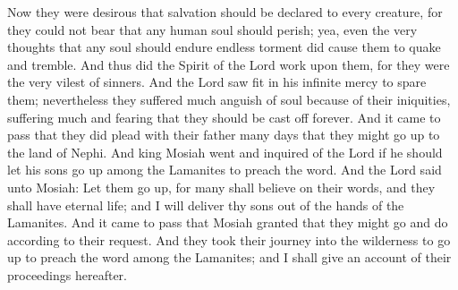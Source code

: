 \bverse \iffalse Now they were desirous that salvation should be declared to every creature, for they could not bear that any human soul should perish; yea, even the very thoughts that any soul should endure endless torment did cause them to quake and tremble. \fi
Now they were desirous that salvation should be declared to every creature, for they could not bear that any human soul should perish; yea, even the very thoughts that any soul should endure endless torment did cause them to quake and tremble.
\bverse \iffalse And thus did the Spirit of the Lord work upon them, for they were the very vilest of sinners. And the Lord saw fit in his infinite mercy to spare them; nevertheless they suffered much anguish of soul because of their iniquities, suffering much and fearing that they should be cast off forever. \fi
And thus did the Spirit of the Lord work upon them, for they were the very vilest of sinners. And the Lord saw fit in his infinite mercy to spare them; nevertheless they suffered much anguish of soul because of their iniquities, suffering much and fearing that they should be cast off forever.
\bverse \iffalse And it came to pass that they did plead with their father many days that they might go up to the land of Nephi. \fi
And it came to pass that they did plead with their father many days that they might go up to the land of Nephi.
\bverse \iffalse And king Mosiah went and inquired of the Lord if he should let his sons go up among the Lamanites to preach the word. \fi
And king Mosiah went and inquired of the Lord if he should let his sons go up among the Lamanites to preach the word.
\bverse \iffalse And the Lord said unto Mosiah: Let them go up, for many shall believe on their words, and they shall have eternal life; and I will deliver thy sons out of the hands of the Lamanites. \fi
And the Lord said unto Mosiah: Let them go up, for many shall believe on their words, and they shall have eternal life; and I will deliver thy sons out of the hands of the Lamanites.
\bverse \iffalse And it came to pass that Mosiah granted that they might go and do according to their request. \fi
And it came to pass that Mosiah granted that they might go and do according to their request.
\bverse \iffalse And they took their journey into the wilderness to go up to preach the word among the Lamanites; and I shall give an account of their proceedings hereafter. \fi
And they took their journey into the wilderness to go up to preach the word among the Lamanites; and I shall give an account of their proceedings hereafter.
